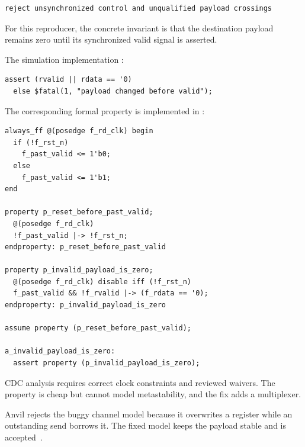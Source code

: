 \documentclass[conference]{IEEEtran}
\begin{document}
\begin{lstlisting}
reject unsynchronized control and unqualified payload crossings
\end{lstlisting}

For this reproducer, the concrete invariant is that the
destination payload remains zero until its synchronized valid signal is
asserted.

The simulation implementation \cite{bug3-simulation-check}:

\begin{lstlisting}
assert (rvalid || rdata == '0)
  else $fatal(1, "payload changed before valid");
\end{lstlisting}

The corresponding formal property is implemented in
\cite{bug3-formal-check}:

\begin{lstlisting}
always_ff @(posedge f_rd_clk) begin
  if (!f_rst_n)
    f_past_valid <= 1'b0;
  else
    f_past_valid <= 1'b1;
end

property p_reset_before_past_valid;
  @(posedge f_rd_clk)
  !f_past_valid |-> !f_rst_n;
endproperty: p_reset_before_past_valid

property p_invalid_payload_is_zero;
  @(posedge f_rd_clk) disable iff (!f_rst_n)
  f_past_valid && !f_rvalid |-> (f_rdata == '0);
endproperty: p_invalid_payload_is_zero

assume property (p_reset_before_past_valid);

a_invalid_payload_is_zero:
  assert property (p_invalid_payload_is_zero);
\end{lstlisting}

CDC analysis requires correct clock constraints and reviewed waivers. The
property is cheap but cannot model metastability, and the fix adds a multiplexer.

Anvil rejects the buggy channel model because it overwrites a register while an
outstanding send borrows it. The fixed model keeps the payload stable and is
accepted~\cite{bug3-anvil-buggy,bug3-anvil-fixed,bug3-anvil-results}.

\end{document}
